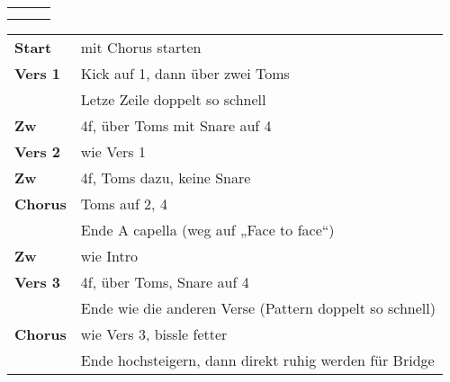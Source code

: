 

\begin{tabular}{p{0.6cm}p{12cm}p{1.4cm}}
	\rowcolor{cyan} \myRow{\thesongnumber} & \myRow{Every Step} & \myRow{102} \\ %
	                                       &                    &             \\
\end{tabular}

\begin{tabular}{p{1.6cm}l}
	\textbf{Start}  & mit Chorus starten                                                       \\
	\textbf{Vers 1} & Kick auf 1, dann über zwei Toms                                          \\
	                & Letze Zeile doppelt so schnell                                           \\
	\textbf{Zw}     & 4f, über Toms mit Snare auf 4                                            \\
	\textbf{Vers 2} & wie Vers 1                                                               \\
	\textbf{Zw}     & 4f, Toms dazu, keine Snare                                               \\
	\textbf{Chorus} & Toms auf 2, 4                                                            \\
	                & Ende A capella (weg auf „Face to face“)                                  \\
	\textbf{Zw}     & wie Intro                                                                \\
	\textbf{Vers 3} & 4f, über Toms, Snare auf 4                                               \\
	                & Ende wie die anderen Verse (Pattern doppelt so schnell)                  \\
	\textbf{Chorus} & wie Vers 3, bissle fetter                                                \\
	                & Ende hochsteigern, dann direkt ruhig werden für Bridge                   \\

\end{tabular}
